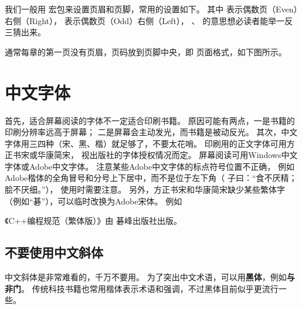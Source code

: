 \vspace{1ex}
\centerline{%
\quad{}}

\vspace{1ex}
我们一般用  宏包来设置页眉和页脚，常用的设置如下。
其中  表示偶数页\linebreak（Even）右侧（Right），
 表示偶数页（Odd）右侧（Left），
、 的意思想必读者能举一反三猜出来。

\begin{Code}
\pagestyle{fancy}
\fancyhf{}
\fancyhead[RE]{\normalfont\small\rmfamily\nouppercase{\leftmark}}
\fancyhead[LO]{\normalfont\small\rmfamily\nouppercase{\rightmark}}
\fancyhead[LE,RO]{\thepage}
\end{Code}

通常每章的第一页没有页眉，页码放到页脚中央，即  页面格式，如下图所示。

\vspace{1ex}
\centerline{}

\section{中文字体} %

首先，适合屏幕阅读的字体不一定适合印刷书籍。
原因可能有两点，一是书籍的印刷分辨率远高于屏幕；
二是屏幕会主动发光，而书籍是被动反光。
其次，中文字体用三四种（宋、黑、楷）就足够了，不要太花哨。
印刷用的正文字体可用方正书宋或华康简宋，
视出版社的字体授权情况而定。
屏幕阅读可用Windows中文字体或Adobe中文字体。
注意某些Adobe中文字体的标点符号位置不正确，
例如Adobe楷体的全角冒号和分号上下居中，而不是位于左下角（
{子曰：“食不厌精；脍不厌细。”}），
使用时需要注意。
另外，方正书宋和华康简宋缺少某些繁体字（例如“碁”），可以临时改换为Adobe宋体。
例如
\begin{Code}
《C++编程规范（繁体版）》由{ 碁峰}出版社出版。
\end{Code}

\subsection{不要使用中文斜体}
\label{subsec:noChineseItalic}
中文斜体是非常难看的，千万不要用。
为了突出中文术语，可以用\textbf{黑体}，例如\textbf{与非门}。
传统科技书籍也常用{\kaishu 楷体}表示术语和强调，不过黑体目前似乎更流行一些。


